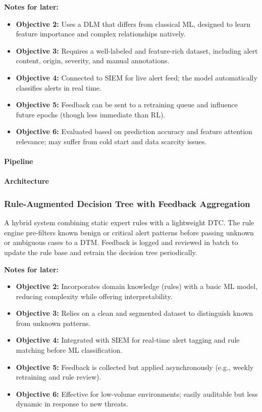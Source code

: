 \textbf{Notes for later:}
\begin{itemize}
    \item \textbf{Objective 2:} Uses a \gls{DLM} that differs from classical \gls{ML}, designed to learn feature importance and complex relationships natively.
    \item \textbf{Objective 3:} Requires a well-labeled and feature-rich dataset, including alert content, origin, severity, and manual annotations.
    \item \textbf{Objective 4:} Connected to \gls{SIEM} for live alert feed; the model automatically classifies alerts in real time.
    \item \textbf{Objective 5:} Feedback can be sent to a retraining queue and influence future epochs (though less immediate than \gls{RL}).
    \item \textbf{Objective 6:} Evaluated based on prediction accuracy and feature attention relevance; may suffer from cold start and data scarcity issues.
\end{itemize}

\paragraph{Pipeline}
\paragraph{Architecture}

\subsubsection{Rule-Augmented Decision Tree with Feedback Aggregation}
A hybrid system combining static expert rules with a lightweight \gls{DTC}. 
The rule engine pre-filters known benign or critical alert patterns before passing unknown or ambiguous cases to a \gls{DTM}. 
Feedback is logged and reviewed in batch to update the rule base and retrain the decision tree periodically.

\textbf{Notes for later:}
\begin{itemize}
    \item \textbf{Objective 2:} Incorporates domain knowledge (rules) with a basic \gls{ML} model, reducing complexity while offering interpretability.
    \item \textbf{Objective 3:} Relies on a clean and segmented dataset to distinguish known from unknown patterns.
    \item \textbf{Objective 4:} Integrated with \gls{SIEM} for real-time alert tagging and rule matching before \gls{ML} classification.
    \item \textbf{Objective 5:} Feedback is collected but applied asynchronously (e.g., weekly retraining and rule review).
    \item \textbf{Objective 6:} Effective for low-volume environments; easily auditable but less dynamic in response to new threats.
\end{itemize}

